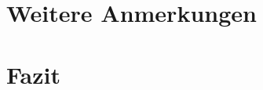 \documentclass[a4paper]{scrartcl}
\begin{document}
\section{Weitere Anmerkungen}












\section{Fazit}

\end{document}

